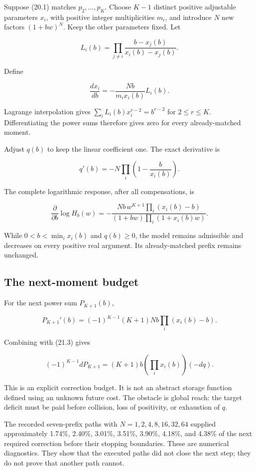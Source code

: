 \documentclass[
  10pt,
  a4paper,
  10pt,
  oneside,
  openany]{book}
\begin{document}
Suppose (20.1) matches \(p_2,\ldots,p_K\). Choose \(K-1\) distinct
positive adjustable parameters \(x_i\), with positive integer
multiplicities \(m_i\), and introduce \(N\) new factors \((1+bw)^N\).
Keep the other parameters fixed. Let

\[
L_i(b)=\prod_{j\ne i}\frac{b-x_j(b)}{x_i(b)-x_j(b)}.
\tag{21.1}\label{eq:21.1}
\]

Define

\[
\frac{dx_i}{db}=-\frac{Nb}{m_ix_i(b)}L_i(b).
\tag{21.2}\label{eq:21.2}
\]

Lagrange interpolation gives \(\sum_iL_i(b)x_i^{r-2}=b^{r-2}\) for
\(2\le r\le K\). Differentiating the power sums therefore gives zero for
every already-matched moment.

Adjust \(q(b)\) to keep the linear coefficient one. The exact derivative
is

\[
q'(b)=-N\prod_i\left(1-\frac b{x_i(b)}\right).
\tag{21.3}\label{eq:21.3}
\]

The complete logarithmic response, after all compensations, is

\[
\frac{\partial}{\partial b}\log H_b(w)
=-\frac{Nb\,w^{K+1}\prod_i(x_i(b)-b)}
{(1+bw)\prod_i(1+x_i(b)w)}.
\tag{21.4}\label{eq:21.4}
\]

While \(0<b<\min_i x_i(b)\) and \(q(b)\ge0\), the model remains
admissible and decreases on every positive real argument. Its
already-matched prefix remains unchanged.

\subsection{The next-moment budget}\label{the-next-moment-budget}

For the next power sum \(P_{K+1}(b)\),

\[
P_{K+1}'(b)
=(-1)^{K-1}(K+1)Nb\prod_i(x_i(b)-b).
\tag{21.5}\label{eq:21.5}
\]

Combining with (21.3) gives

\[
(-1)^{K-1}dP_{K+1}
=(K+1)b\left(\prod_i x_i(b)\right)(-dq).
\tag{21.6}\label{eq:21.6}
\]

This is an explicit correction budget. It is not an abstract storage
function defined using an unknown future cost. The obstacle is global
reach: the target deficit must be paid before collision, loss of
positivity, or exhaustion of \(q\).

The recorded seven-prefix paths with \(N=1,2,4,8,16,32,64\) supplied
approximately 1.74\%, 2.40\%, 3.01\%, 3.51\%, 3.90\%, 4.18\%, and 4.38\%
of the next required correction before their stopping boundaries. These
are numerical diagnostics. They show that the executed paths did not
close the next step; they do not prove that another path cannot.
\end{document}
